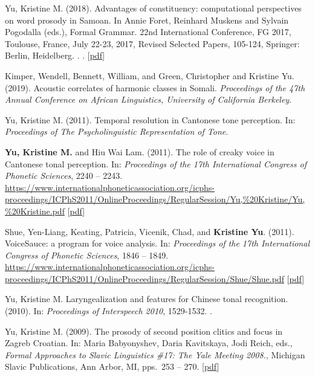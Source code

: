 \documentclass[10pt]{article}
\begin{document}
\begin{bibenum}
\item Yu, Kristine M. (2018). Advantages of constituency: computational perspectives on word prosody in Samoan. In Annie Foret, Reinhard Muskens and Sylvain Pogodalla (eds.), Formal Grammar. 22nd International Conference, FG 2017, Toulouse, France, July 22-23, 2017, Revised Selected Papers, 105-124, Springer: Berlin, Heidelberg. . . [\href{https://github.com/krismyu/smo-constituency-feet/blob/master/fg-kmyu.pdf}{pdf}]

  \item Kimper, Wendell, Bennett, William, and Green, Christopher and Kristine Yu. (2019). Acoustic correlates of harmonic classes in
    Somali. \emph{Proceedings of the 47th Annual Conference on African Linguistics, University of California Berkeley}.

    \item Yu, Kristine M. (2011). Temporal resolution in {C}antonese tone
      perception. In: \emph{Proceedings of The Psycholinguistic Representation of Tone}.

    \item \textbf{Yu, Kristine M.} and Hiu Wai Lam. (2011). The role of creaky
      voice in {C}antonese tonal perception. In: \emph{Proceedings of the
        17th International Congress of Phonetic Sciences},
      2240 -- 2243. \url{https://www.internationalphoneticassociation.org/icphs-proceedings/ICPhS2011/OnlineProceedings/RegularSession/Yu,%20Kristine/Yu,%20Kristine.pdf} [\href{http://www.krisyu.org/pages/pdfs/yu-lam2011-icphs-cantonese-creak.pdf}{pdf}]

    \item Shue, Yen-Liang, Keating, Patricia, Vicenik, Chad, and \textbf{Kristine
      Yu}. (2011). VoiceSauce: a program for voice analysis. In:
      \emph{Proceedings of the 17th International Congress of Phonetic
        Sciences}, 1846 -- 1849. \url{https://www.internationalphoneticassociation.org/icphs-proceedings/ICPhS2011/OnlineProceedings/RegularSession/Shue/Shue.pdf} [\href{http://www.krisyu.org/pages/pdfs/shueETAL2011-icphsxvii-voicesauce.pdf}{pdf}]

    \item Yu, Kristine M. Laryngealization and features for Chinese
      tonal recognition. (2010). In: \emph{Proceedings of Interspeech 2010}, 1529-1532. .

    \item Yu, Kristine M. (2009). The prosody of second position clitics and focus in Zagreb Croatian. In: Maria Babyonyshev, Daria Kavitskaya, Jodi Reich, eds., \emph{Formal Approaches to Slavic Linguistics \#17: The Yale Meeting 2008.}, Michigan Slavic Publications, Ann Arbor, MI, pps.\ 253 -- 270. [\href{http://www.krisyu.org/pages/pdfs/yu2009-fasl17-croatian-2pc.pdf}{pdf}]

\end{bibenum}
\end{document}
